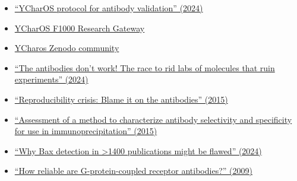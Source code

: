 \documentclass[letterpaper, 12pt]{article}
\begin{document}
\begin{itemize}
    \setlength\itemsep{-0.5em}
    \item \href{https://doi.org/10.1038/s41596-024-01108-6}{``YCharOS protocol for antibody validation'' (2024)}
    \item \href{https://f1000research.com/ycharos}{YCharOS F1000 Research Gateway}
    \item \href{https://zenodo.org/communities/ycharos/records?q=&l=list&p=1&s=10&sort=newest}{YCharos Zenodo community}
    \item \href{https://doi.org/10.1038/d41586-024-03590-0}{``The antibodies don’t work! The race to rid labs of molecules that ruin experiments'' (2024)}
    \item \href{https://doi.org/10.1038/521274a}{``Reproducibility crisis: Blame it on the antibodies'' (2015)}
    \item \href{https://doi.org/10.1038/nmeth.3472}{``Assessment of a method to characterize antibody selectivity and specificity for use in immunoprecipitation'' (2015)}
    \item \href{https://doi.org/10.1038/s41419-024-07273-6}{``Why Bax detection in >1400 publications might be flawed'' (2024)}
    \item \href{https://doi.org/10.1007/s00210-009-0395-y}{``How reliable are G-protein-coupled receptor antibodies?'' (2009)}
\end{itemize}
\end{document}
